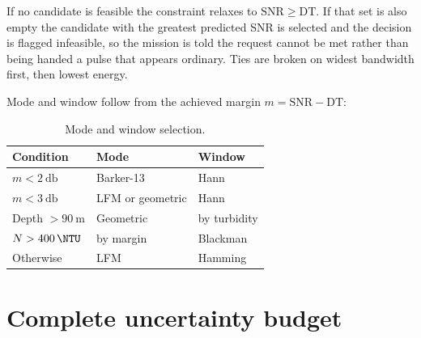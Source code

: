 \documentclass[11pt,a4paper]{article}
\begin{document}
If no candidate is feasible the constraint relaxes to
$\mathrm{SNR} \geq \mathrm{DT}$. If that set is also empty the candidate with
the greatest predicted SNR is selected and the decision is flagged infeasible,
so the mission is told the request cannot be met rather than being handed a
pulse that appears ordinary. Ties are broken on widest bandwidth first, then
lowest energy.

Mode and window follow from the achieved margin $m = \mathrm{SNR} - \mathrm{DT}$:

\begin{table}[htbp]
\centering
\small
\begin{tabular}{lll}
\toprule
\textbf{Condition} & \textbf{Mode} & \textbf{Window} \\
\midrule
$m < \SI{2}{\decibel}$ & Barker-13 & Hann \\
$m < \SI{3}{\decibel}$ & LFM or geometric & Hann \\
Depth $> \SI{90}{\metre}$ & Geometric & by turbidity \\
$N > \SI{400}{\NTU}$ & by margin & Blackman \\
Otherwise & LFM & Hamming \\
\bottomrule
\end{tabular}
\caption{Mode and window selection.}
\end{table}

\section{Complete uncertainty budget}
\end{document}
